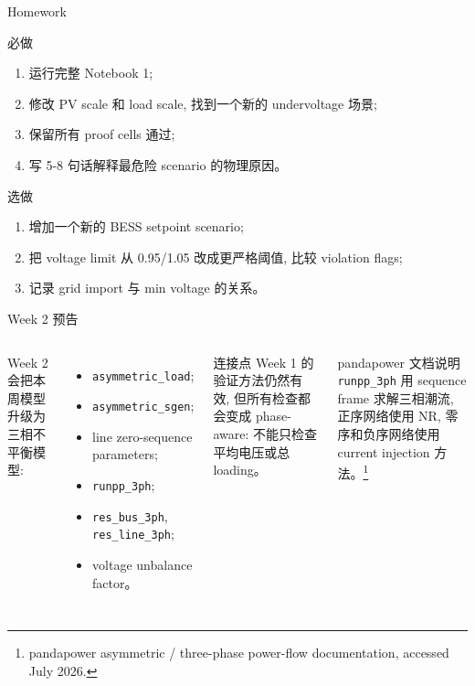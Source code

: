 \documentclass[aspectratio=169,10pt]{ctexbeamer}
\newcommand{\code}[1]{\texttt{#1}}
\begin{document}
\begin{frame}{Homework}
\begin{block}{必做}
\begin{enumerate}
  \item 运行完整 Notebook 1;
  \item 修改 PV scale 和 load scale, 找到一个新的 undervoltage 场景;
  \item 保留所有 proof cells 通过;
  \item 写 5-8 句话解释最危险 scenario 的物理原因。
\end{enumerate}
\end{block}
\begin{block}{选做}
\begin{enumerate}
  \item 增加一个新的 BESS setpoint scenario;
  \item 把 voltage limit 从 0.95/1.05 改成更严格阈值, 比较 violation flags;
  \item 记录 grid import 与 min voltage 的关系。
\end{enumerate}
\end{block}
\end{frame}

\begin{frame}{Week 2 预告}
\begin{columns}[T]
Week 2 会把本周模型升级为三相不平衡模型:
\begin{itemize}
  \item \code{asymmetric\_load};
  \item \code{asymmetric\_sgen};
  \item line zero-sequence parameters;
  \item \code{runpp\_3ph};
  \item \code{res\_bus\_3ph}, \code{res\_line\_3ph};
  \item voltage unbalance factor。
\end{itemize}
\begin{alertblock}{连接点}
Week 1 的验证方法仍然有效, 但所有检查都会变成 phase-aware: 不能只检查平均电压或总 loading。
\end{alertblock}
\footnotesize pandapower 文档说明 \code{runpp\_3ph} 用 sequence frame 求解三相潮流, 正序网络使用 NR, 零序和负序网络使用 current injection 方法。\footnote{pandapower asymmetric / three-phase power-flow documentation, accessed July 2026.}
\end{columns}
\end{frame}
\end{document}
